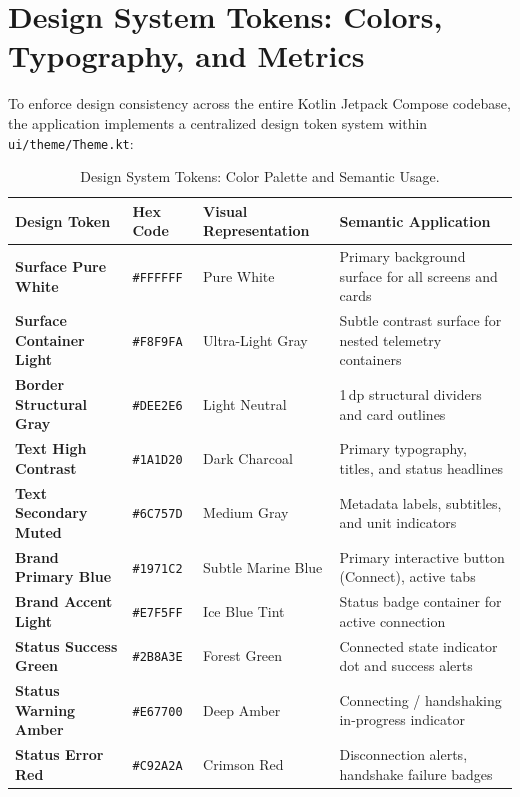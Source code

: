 \section{Design System Tokens: Colors, Typography, and Metrics}
\label{sec:ui_design_tokens}

To enforce design consistency across the entire Kotlin Jetpack Compose codebase, the application implements a centralized design token system within \texttt{ui/theme/Theme.kt}:

\begin{table}[htbp]
  \centering
  \small
  \caption{Design System Tokens: Color Palette and Semantic Usage.}
  \label{tab:design_tokens_color}
  \begin{tabular}{@{}P{3.5cm}P{2.2cm}P{3.0cm}P{5.5cm}@{}}
    \toprule
    \textbf{Design Token} & \textbf{Hex Code} & \textbf{Visual Representation} & \textbf{Semantic Application} \\
    \midrule
    \textbf{Surface Pure White} & \texttt{\#FFFFFF} & Pure White & Primary background surface for all screens and cards \\
    \textbf{Surface Container Light} & \texttt{\#F8F9FA} & Ultra-Light Gray & Subtle contrast surface for nested telemetry containers \\
    \textbf{Border Structural Gray} & \texttt{\#DEE2E6} & Light Neutral & 1\,dp structural dividers and card outlines \\
    \textbf{Text High Contrast} & \texttt{\#1A1D20} & Dark Charcoal & Primary typography, titles, and status headlines \\
    \textbf{Text Secondary Muted} & \texttt{\#6C757D} & Medium Gray & Metadata labels, subtitles, and unit indicators \\
    \textbf{Brand Primary Blue} & \texttt{\#1971C2} & Subtle Marine Blue & Primary interactive button (Connect), active tabs \\
    \textbf{Brand Accent Light} & \texttt{\#E7F5FF} & Ice Blue Tint & Status badge container for active connection \\
    \textbf{Status Success Green} & \texttt{\#2B8A3E} & Forest Green & Connected state indicator dot and success alerts \\
    \textbf{Status Warning Amber} & \texttt{\#E67700} & Deep Amber & Connecting / handshaking in-progress indicator \\
    \textbf{Status Error Red} & \texttt{\#C92A2A} & Crimson Red & Disconnection alerts, handshake failure badges \\
    \bottomrule
  \end{tabular}
\end{table}

